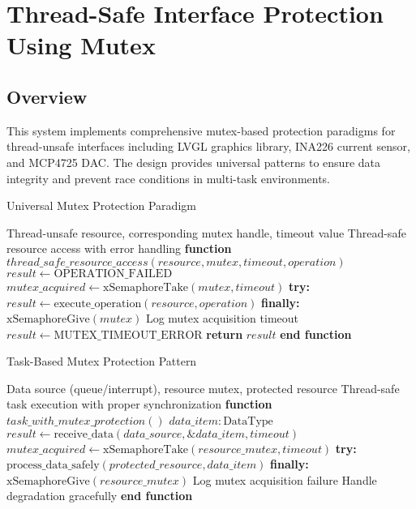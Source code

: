 \documentclass{article}
\begin{document}
\section{Thread-Safe Interface Protection Using Mutex}

\subsection{Overview}

This system implements comprehensive mutex-based protection paradigms for thread-unsafe interfaces including LVGL graphics library, INA226 current sensor, and MCP4725 DAC. The design provides universal patterns to ensure data integrity and prevent race conditions in multi-task environments.

\begin{algorithm}
\caption{Universal Mutex Protection Paradigm}
\label{alg:universal_mutex_paradigm}
\begin{algorithmic}[1]
\REQUIRE Thread-unsafe resource, corresponding mutex handle, timeout value
\ENSURE Thread-safe resource access with error handling
\STATE \textbf{function} $thread\_safe\_resource\_access(resource, mutex, timeout, operation)$
\STATE $result \leftarrow \text{OPERATION\_FAILED}$
\STATE $mutex\_acquired \leftarrow \text{xSemaphoreTake}(mutex, timeout)$
    \STATE \textbf{try:}
    \STATE \quad $result \leftarrow \text{execute\_operation}(resource, operation)$
    \STATE \textbf{finally:}
    \STATE \quad $\text{xSemaphoreGive}(mutex)$ 
\ELSE
    \STATE Log mutex acquisition timeout
    \STATE $result \leftarrow \text{MUTEX\_TIMEOUT\_ERROR}$
\ENDIF
\STATE \textbf{return} $result$
\STATE \textbf{end function}
\end{algorithmic}
\end{algorithm}

\begin{algorithm}
\caption{Task-Based Mutex Protection Pattern}
\label{alg:task_mutex_pattern}
\begin{algorithmic}[1]
\REQUIRE Data source (queue/interrupt), resource mutex, protected resource
\ENSURE Thread-safe task execution with proper synchronization
\STATE \textbf{function} $task\_with\_mutex\_protection()$
\STATE $data\_item: \text{DataType}$
    \STATE $result \leftarrow \text{receive\_data}(data\_source, \&data\_item, timeout)$
        \STATE $mutex\_acquired \leftarrow \text{xSemaphoreTake}(resource\_mutex, timeout)$
            \STATE \textbf{try:}
            \STATE \quad $\text{process\_data\_safely}(protected\_resource, data\_item)$
            \STATE \textbf{finally:}
            \STATE \quad $\text{xSemaphoreGive}(resource\_mutex)$ 
        \ELSE
            \STATE Log mutex acquisition failure
            \STATE Handle degradation gracefully
        \ENDIF
    \ENDIF
\ENDWHILE
\STATE \textbf{end function}
\end{algorithmic}
\end{algorithm}
\end{document}
